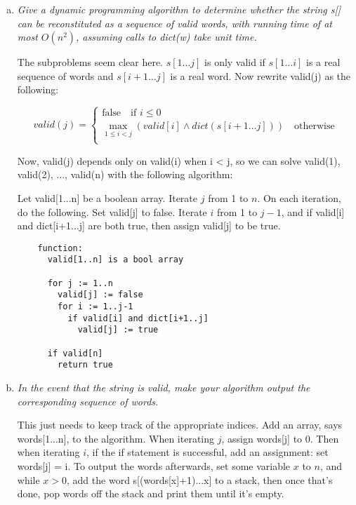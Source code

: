 \documentclass{article}
\begin{document}
\begin{enumerate}[(a)]
  \item \textit{Give a dynamic programming algorithm to determine whether the string s[] can be reconstituted as a sequence of valid words, with running time of at most $O(n^2)$, assuming calls to dict(w) take unit time.}

    The subproblems seem clear here. $s[1\dots j]$ is only valid if $s[1\dots i]$ is a real sequence of words and $s[i+1\dots j]$ is a real word. Now rewrite valid(j) as the following:

  \[
    valid(j) =
    \begin{cases}
      \text{false} \quad \text{if } i \leq 0 \\
      \max_{1\leq i < j}(valid[i] \wedge dict(s[i+1\dots j])) \quad \text{otherwise} \\
    \end{cases}
  \]

    Now, valid(j) depends only on valid(i) when i < j, so we can solve valid(1), valid(2), ..., valid(n) with the following algorithm:

    Let valid[1...n] be a boolean array. Iterate $j$ from 1 to $n$. On each iteration, do the following. Set valid[j] to false. Iterate $i$ from 1 to $j-1$, and if valid[i] and dict[i+1...j] are both true, then assign valid[j] to be true.

    \begin{verbatim}
    function:
      valid[1..n] is a bool array

      for j := 1..n
        valid[j] := false
        for i := 1..j-1
          if valid[i] and dict[i+1..j]
            valid[j] := true

      if valid[n]
        return true
    \end{verbatim}

  \item \textit{In the event that the string is valid, make your algorithm output the corresponding sequence of words.}

    This just needs to keep track of the appropriate indices. Add an array, says words[1...n], to the algorithm. When iterating $j$, assign words[j] to 0. Then when iterating $i$, if the if statement is successful, add an assignment: set words[j] = i. To output the words afterwards, set some variable $x$ to $n$, and while $x > 0$, add the word s[(words[x]+1)...x] to a stack, then once that's done, pop words off the stack and print them until it's empty.


\end{enumerate}
\end{document}

